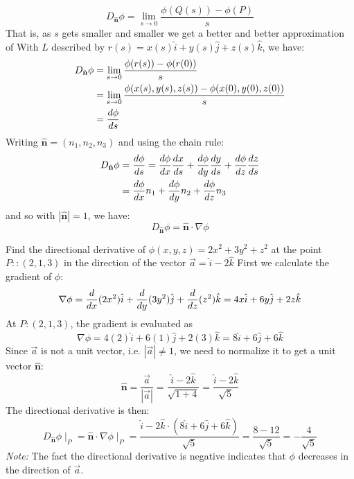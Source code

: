 \documentclass[a4paper, 10pt]{article}
\begin{document}
$$D_{\hat{\mathbf{n}}} \phi = \lim_{s \to 0} \frac{\phi(Q(s)) - \phi(P)}{s}$$
That is, as $s$ gets smaller and smaller we get a better and better approximation of
With $L$ described by $r(s) = x(s) \hat{i} + y(s) \hat{j} + z(s) \hat{k}$, we have:
\begin{align*}
  D_{\hat{\mathbf{n}}} \phi & = \lim_{s \to 0} \frac{\phi(r(s)) - \phi(r(0))}{s}                         \\
                            & = \lim_{s \to 0} \frac{\phi(x(s), y(s), z(s)) - \phi(x(0), y(0), z(0))}{s} \\
                            & = \frac{d\phi}{ds}
\end{align*}
Writing $\hat{\mathbf{n}} = (n_1, n_2, n_3)$ and using the chain rule:
\begin{align}
  D_{\hat{\mathbf{n}}} \phi & = \frac{d\phi}{ds} = \frac{d\phi}{dx} \frac{dx}{ds} + \frac{d\phi}{dy} \frac{dy}{ds} + \frac{d\phi}{dz} \frac{dz}{ds} \nonumber \\
                            & = \frac{d\phi}{dx} n_1 + \frac{d\phi}{dy} n_2 + \frac{d\phi}{dz} n_3
\end{align}
and so with $|\hat{\mathbf{n}}| = 1$, we have:
$$D_{\hat{\mathbf{n}}} \phi = \hat{\mathbf{n}} \cdot \nabla \phi $$

\begin{examplebox}{Find the directional derivative of $\phi(x,y,z) = 2x^2 + 3y^2 + z^2$ at the point $P: : (2,1,3)$ in the direction of the vector $\vec{a} = \hat{i} - 2\hat{k}$}{}
  First we calculate the gradient of $\phi$:
  $$\nabla \phi = \frac{d}{dx}(2x^2) \hat{i} + \frac{d}{dy}(3y^2) \hat{j} + \frac{d}{dz}(z^2) \hat{k} = 4x \hat{i} + 6y \hat{j} + 2z \hat{k}$$
  At $P : (2,1,3)$, the gradient is evaluated as
  $$\nabla \phi = 4(2) \hat{i} + 6(1) \hat{j} + 2(3) \hat{k} = 8 \hat{i} + 6 \hat{j} + 6 \hat{k}$$
  Since $\vec{a}$ is not a unit vector, i.e. $|\vec{a}| \neq 1$, we need to normalize it to get a unit vector $\hat{\mathbf{n}}$:
  $$\hat{\mathbf{n}} = \frac{\vec{a}}{|\vec{a}|} = \frac{\hat{i} - 2\hat{k}}{\sqrt{1 + 4}} = \frac{\hat{i} - 2\hat{k}}{\sqrt{5}}$$
  The directional derivative is then:
  $$D_{\hat{\mathbf{n}}} \phi \mid_P = \hat{\mathbf{n}} \cdot \nabla \phi\mid_P = \frac{\hat{i} - 2\hat{k} \cdot (8\hat{i} + 6\hat{j} + 6\hat{k})}{\sqrt{5}} = \frac{8 - 12}{\sqrt{5}} = -\frac{4}{\sqrt{5}}$$
  \emph{Note:} The fact the directional derivative is negative indicates that $\phi$ decreases in the direction of $\vec{a}$.
\end{examplebox}
\pagebreak
\end{document}
